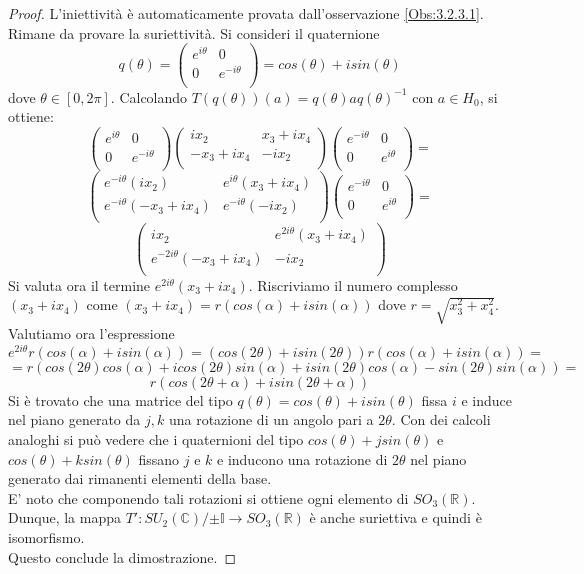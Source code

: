 \documentclass[12pt,a4paper]{report}
\theoremstyle{definition}
\theoremstyle{definition}
\theoremstyle{definition}
\theoremstyle{definition}
\begin{document}
\begin{proof}
	L'iniettività è automaticamente provata dall'osservazione \ref{Obs:3.2.3.1}. Rimane da provare la suriettività.
	Si consideri il quaternione 
	$$q(\theta)=
	\begin{pmatrix}
		e^{i\theta} & 0\\
		0 & e^{-i\theta}\\
	\end{pmatrix}=cos(\theta)+isin(\theta)$$
dove $\theta\in [0,2\pi]$. Calcolando $T(q(\theta))(a)=q(\theta)aq(\theta)^{-1}$ con $a\in H_0$, si ottiene:
$$\begin{pmatrix}
	e^{i\theta} & 0\\
	0 & e^{-i\theta}\\
\end{pmatrix}
\begin{pmatrix}
	ix_2 & x_3+ix_4\\
	-x_3+ix_4 & -ix_2\\
\end{pmatrix}
\begin{pmatrix}
e^{-i\theta} & 0\\
0 & e^{i\theta}\\
\end{pmatrix}=$$
$$\begin{pmatrix}
	e^{-i\theta}(ix_2) & e^{i\theta}(x_3+ix_4)\\
	e^{-i\theta}(-x_3+ix_4) & e^{-i\theta}(-ix_2)\\
\end{pmatrix}
\begin{pmatrix}
	e^{-i\theta} & 0\\
	0 & e^{i\theta}\\
\end{pmatrix}=$$
$$\begin{pmatrix}
	ix_2 & e^{2i\theta}(x_3+ix_4)\\
	e^{-2i\theta}(-x_3+ix_4) & -ix_2\\
\end{pmatrix}$$
Si valuta ora il termine $e^{2i\theta}(x_3+ix_4)$. Riscriviamo il numero complesso $(x_3+ix_4)$ come $(x_3+ix_4)=r(cos(\alpha)+isin(\alpha))$ dove $r=\sqrt{x_3^2+x_4^2}$. Valutiamo ora l'espressione 
$$e^{2i\theta}r(cos(\alpha)+isin(\alpha))=
(cos(2\theta)+isin(2\theta))r(cos(\alpha)+isin(\alpha))=$$
$$=r(cos(2\theta)cos(\alpha)+icos(2\theta)sin(\alpha)+isin(2\theta)cos(\alpha)-sin(2\theta)sin(\alpha))=$$
$$r(cos(2\theta+\alpha)+isin(2\theta+\alpha))$$
Si è trovato che una matrice del tipo $q(\theta)=cos(\theta)+isin(\theta)$ fissa $i$ e induce nel piano generato da $j,k$ una rotazione di un angolo pari a $2\theta$. Con dei calcoli analoghi si può vedere che i quaternioni del tipo $cos(\theta)+jsin(\theta)$ e $cos(\theta)+ksin(\theta)$ fissano $j$ e $k$ e inducono una rotazione di $2\theta$ nel piano generato dai rimanenti elementi della base.\\
E' noto che componendo tali rotazioni si ottiene ogni elemento di $SO_3(\mathbb{R})$. Dunque, la mappa $T':SU_2(\mathbb{C})/{\pm \mathbb{I}}\longrightarrow SO_3(\mathbb{R})$ è anche suriettiva e quindi è isomorfismo.\\
Questo conclude la dimostrazione.
\end{proof}
\end{document}
